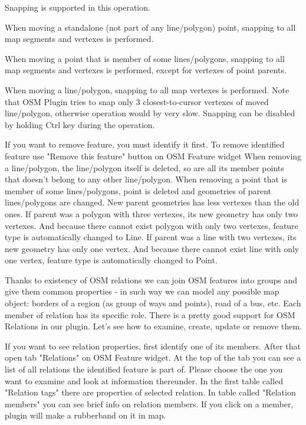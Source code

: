 Snapping is supported in this operation.

When moving a standalone (not part of any line/polygon) point, snapping to
all map segments and vertexes is performed.

When moving a point that is member of some lines/polygons, snapping to all
map segments and vertexes is performed, except for vertexes of point parents.

When moving a line/polygon, snapping to all map vertexes is performed. Note
that OSM Plugin tries to snap only 3 closest-to-cursor vertexes of moved
line/polygon, otherwise operation would by very slow.
Snapping can be disabled by holding Ctrl key during the operation.


If you want to remove feature, you must identify it first.
To remove identified feature use "Remove this feature" button on OSM Feature
widget   
When removing a line/polygon, the line/polygon itself is deleted, so are all
its member points that doesn't belong to any other line/polygon.
When removing a point that is member of some lines/polygons, point is deleted
and geometries of parent lines/polygons are changed. New parent geometries
has less vertexes than the old ones.
If parent was a polygon with three vertexes, its new geometry has only two
vertexes. And because there cannot exist polygon with only two vertexes,
feature type is automatically changed to Line.
If parent was a line with two vertexes, its new geometry has only one vertex.
And because there cannot exist line with only one vertex, feature type is
automatically changed to Point.


Thanks to existency of OSM relations we can join OSM features into groups and
give them common properties - in such way we can model any possible map
object: borders of a region (as group of ways and points), road of a bus,
etc. Each member of relation has its specific role.
There is a pretty good support for OSM Relations in our plugin.
Let's see how to examine, create, update or remove them.


If you want to see relation properties, first identify one of its members.
After that open tab "Relations" on OSM Feature widget. At the top of the tab
you can see a list of all relations the identified feature is part of. Please
choose the one you want to examine and look at information thereunder.
In the first table called "Relation tags" there are properties of selected
relation.
In table called "Relation members" you can see brief info on relation
members.
If you click on a member, plugin will make a rubberband on it in map.

